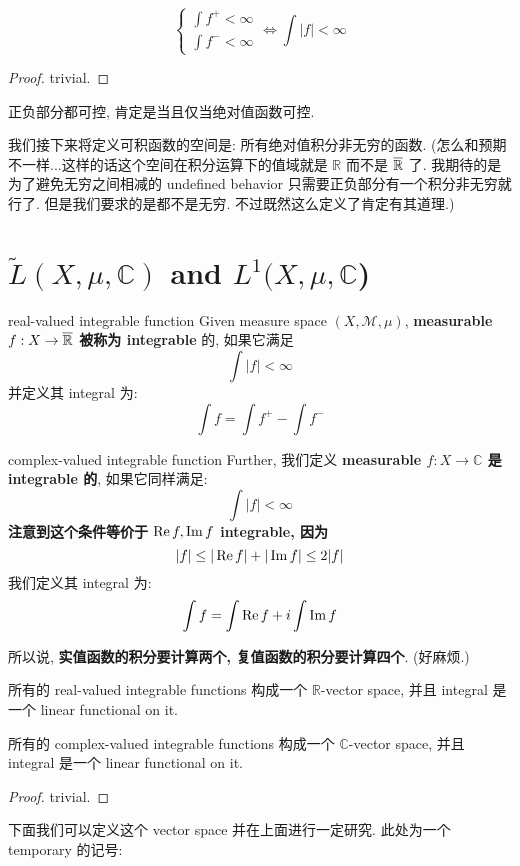 \documentclass[lang=cn,11pt]{elegantbook}
\begin{document}
\begin{lemma}
    \[
    \begin{cases}
        \int f^+ < \infty \\
        \int f^- < \infty
    \end{cases} \Longleftrightarrow \int|f| < \infty
    \]
\end{lemma}
\begin{proof}
    trivial.
\end{proof}
 正负部分都可控, 肯定是当且仅当绝对值函数可控.

 我们接下来将定义可积函数的空间是: 所有绝对值积分非无穷的函数. (怎么和预期不一样...这样的话这个空间在积分运算下的值域就是 $\mathbb{R}$ 而不是 $\overline{\mathbb{R}}$ 了. 我期待的是为了避免无穷之间相减的 undefined behavior 只需要正负部分有一个积分非无穷就行了. 但是我们要求的是都不是无穷.  不过既然这么定义了肯定有其道理.)




\section{$\tilde{L}(X, \mu, \mathbb{C})$ and $L^1(X, \mu, \mathbb{C}$)}
\begin{definition}{real-valued integrable function}
Given measure space $(X,\mathcal{M},\mu)$,  \textbf{measurable $f : X \rightarrow \overline{\mathbb{R}}$ 被称为 integrable} 的, 如果它满足 \[ \int |f| < \infty\] 并定义其 integral 为: \[\int f = \int f^+ - \int f^-\]
\end{definition}
\begin{definition}{complex-valued integrable function}
    Further, 我们定义 \textbf{measurable $f:X \rightarrow \mathbb{C}$ 是 integrable 的}, 如果它同样满足: \[\int |f| < \infty\]
\textbf{注意到这个条件等价于 \(\operatorname{Re} f, \operatorname{Im} f\) integrable, 因为}
\[|f| \leq |\operatorname{Re} f| + |\operatorname{Im} f| \leq 2|f|\]
我们定义其 integral 为: \[\int f = \int \operatorname{Re} f+ i \int \operatorname{Im} f\]
\end{definition}
\begin{remark}
    所以说,\textbf{ 实值函数的积分要计算两个, 复值函数的积分要计算四个}. (好麻烦.)
\end{remark}


\begin{proposition}
    所有的 real-valued integrable functions 构成一个 $\mathbb{R}$-vector space, 并且 integral 是一个 linear functional on it.
    
    所有的 complex-valued integrable functions 构成一个 $\mathbb{C}$-vector space, 并且 integral 是一个 linear functional on it.
\end{proposition}
\begin{proof}
    trivial.
\end{proof}
下面我们可以定义这个 vector space 并在上面进行一定研究. 此处为一个 temporary 的记号:
    
\end{document}
